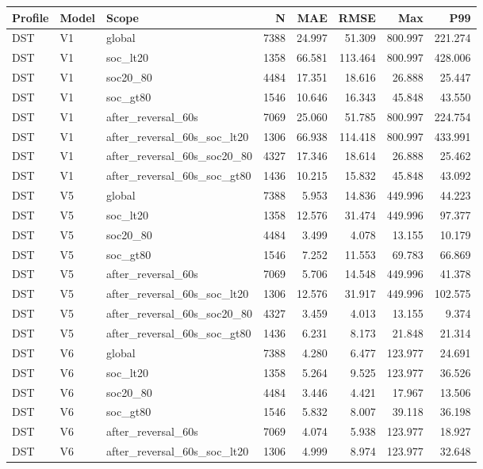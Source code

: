 \begin{tabular}{lllrrrrr}
\hline
Profile & Model & Scope & N & MAE & RMSE & Max & P99 \\
\hline
DST & V1 & global & 7388 & 24.997 & 51.309 & 800.997 & 221.274 \\
DST & V1 & soc\_lt20 & 1358 & 66.581 & 113.464 & 800.997 & 428.006 \\
DST & V1 & soc20\_80 & 4484 & 17.351 & 18.616 & 26.888 & 25.447 \\
DST & V1 & soc\_gt80 & 1546 & 10.646 & 16.343 & 45.848 & 43.550 \\
DST & V1 & after\_reversal\_60s & 7069 & 25.060 & 51.785 & 800.997 & 224.754 \\
DST & V1 & after\_reversal\_60s\_soc\_lt20 & 1306 & 66.938 & 114.418 & 800.997 & 433.991 \\
DST & V1 & after\_reversal\_60s\_soc20\_80 & 4327 & 17.346 & 18.614 & 26.888 & 25.462 \\
DST & V1 & after\_reversal\_60s\_soc\_gt80 & 1436 & 10.215 & 15.832 & 45.848 & 43.092 \\
DST & V5 & global & 7388 & 5.953 & 14.836 & 449.996 & 44.223 \\
DST & V5 & soc\_lt20 & 1358 & 12.576 & 31.474 & 449.996 & 97.377 \\
DST & V5 & soc20\_80 & 4484 & 3.499 & 4.078 & 13.155 & 10.179 \\
DST & V5 & soc\_gt80 & 1546 & 7.252 & 11.553 & 69.783 & 66.869 \\
DST & V5 & after\_reversal\_60s & 7069 & 5.706 & 14.548 & 449.996 & 41.378 \\
DST & V5 & after\_reversal\_60s\_soc\_lt20 & 1306 & 12.576 & 31.917 & 449.996 & 102.575 \\
DST & V5 & after\_reversal\_60s\_soc20\_80 & 4327 & 3.459 & 4.013 & 13.155 & 9.374 \\
DST & V5 & after\_reversal\_60s\_soc\_gt80 & 1436 & 6.231 & 8.173 & 21.848 & 21.314 \\
DST & V6 & global & 7388 & 4.280 & 6.477 & 123.977 & 24.691 \\
DST & V6 & soc\_lt20 & 1358 & 5.264 & 9.525 & 123.977 & 36.526 \\
DST & V6 & soc20\_80 & 4484 & 3.446 & 4.421 & 17.967 & 13.506 \\
DST & V6 & soc\_gt80 & 1546 & 5.832 & 8.007 & 39.118 & 36.198 \\
DST & V6 & after\_reversal\_60s & 7069 & 4.074 & 5.938 & 123.977 & 18.927 \\
DST & V6 & after\_reversal\_60s\_soc\_lt20 & 1306 & 4.999 & 8.974 & 123.977 & 32.648 \\

\end{tabular}
